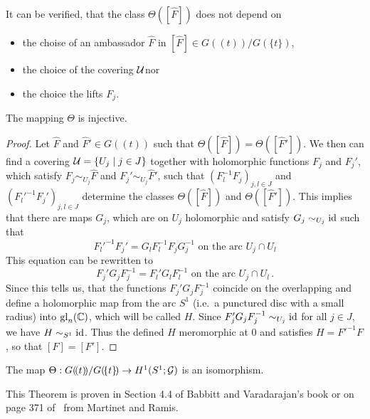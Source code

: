 It can be verified, that the class $\Theta([\hat F])$ does not depend on
\begin{itemize}
  \item the choise of an ambassador $\hat F$ in
    $[\hat F]\in G(\!(t)\!)/G(\!\{t\}\!)$\PROBLEM[proof!],
  \item the choice of the covering $\mathcal{U}$\PROBLEM[proof!] nor
  \item the choice the lifts $F_j$\PROBLEM[proof!].
\end{itemize}
\begin{lem}
  The mapping $\Theta$ is injective.
\end{lem}
\begin{proof}
  Let $\hat F$ and $\hat F'\in G(\!(t)\!)$ such that
  $\Theta([\hat F])=\Theta([\hat F'])$.
  We then can find a covering $\mathcal{U}=\{U_j\mid j\in J\}$ together with
  holomorphic functions $F_j$ and $F_j'$, which satisfy
  $F_j\sim_{U_j}\hat F$ and $F_j'\sim_{U_j}\hat F'$, such that
  $(F_l^{-1}F_j)_{j,l\in J}$ and $(F_l'^{-1}F_j')_{j,l\in J}$ determine the
  classes $\Theta([\hat F])$ and $\Theta([\hat F'])$.
  This implies that there are maps $G_j$, which are on $U_j$ holomorphic and
  satisfy $G_j\sim_{U_j}\operatorname{id}$ such that
  \[
    F_l'^{-1}F_j'=G_lF_l^{-1}F_jG_j^{-1}
    \text{~on~the~arc~} U_j\cap U_l
  \]
  This equation can be rewritten to
  \[
    F_j'G_jF_j^{-1}=F_l'G_lF_l^{-1}
    \text{~on~the~arc~} U_j\cap U_l \,.
  \]
  Since this tells us, that the functions $F_j'G_jF_j^{-1}$ coincide on
  the overlapping and define a holomorphic map from the arc $S^1$ (i.e.\ a
  punctured disc with a small radius) into $\operatorname{gl}_n(\mathbb{C})$, which will be called
  $H$.
  Since $F_j'G_jF_j^{-1}\sim_{U_j}\operatorname{id}$ for all $j\in J$, we have
  $H\sim_{S^1}\operatorname{id}$.
  Thus the defined $H$ meromorphic at $0$ and satisfies $H=F'^{-1}F$, so that
  $[F]=[F']$.
\end{proof}
\begin{thm}\label{thm:thm1helpMalgSibuy}
  The map $\Theta:G(\!(t)\!)/G(\!\{t\}\!)\to H^1(S^1;\mathcal{G})$ is an isomorphism.
\end{thm}
This Theorem is proven in Section 4.4 of Babbitt and Varadarajan's book
\cite{babbitt1989local} or on page 371 of~\cite{Martinet1991} from Martinet and
Ramis.

